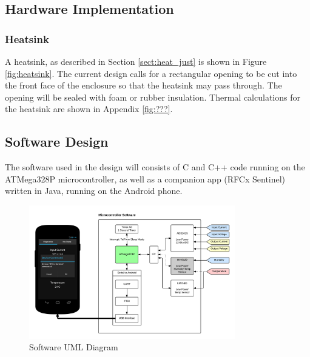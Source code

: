 \documentclass{article}
\numberwithin{figure}{section}
\numberwithin{equation}{section}
\begin{document}
{\subsection{Hardware Implementation} \label{sect:hardwareimp}

\subsubsection{Heatsink} \label{sect:heatsinkimplementation}

A heatsink, as described in Section \ref{sect:heat_just} is shown in Figure \ref{fig:heatsink}.  The current design calls for a rectangular opening to be cut into the front face of the enclosure so that the heatsink may pass through. The opening will be sealed with foam or rubber insulation. Thermal calculations for the heatsink are shown in Appendix \ref{fig:???}.

\newpage
\subsection{Software Design} \label{sect:softwaredes}
The software used in the design will consists of C and C++ code running on the ATMega328P microcontroller, as well as a companion app (RFCx Sentinel) written in Java, running on the Android phone.
\begin{figure}[H]
	\centering
	\includegraphics[width=0.8\textwidth]{SoftwareUMLV2}
	\caption{Software UML Diagram}
	\label{fig:swuml}
\end{figure}

}
\end{document}
